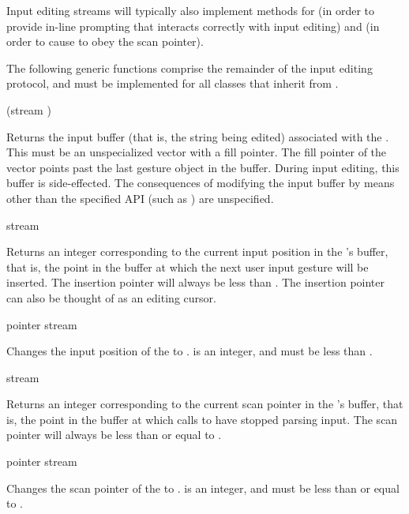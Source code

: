 Input editing streams will typically also implement methods for
 (in order to provide in-line prompting that interacts
correctly with input editing) and  (in order to cause
 to obey the scan pointer).

The following generic functions comprise the remainder of the input editing
protocol, and must be implemented for all classes that inherit from
.


 {(stream )}

Returns the input buffer (that is, the string being edited) associated with the
 .  This must be an unspecialized vector
with a fill pointer.  The fill pointer of the vector points past the last gesture
object in the buffer.  During input editing, this buffer is side-effected.  The
consequences of modifying the input buffer by means other than the specified API
(such as ) are unspecified.

 {stream}

Returns an integer corresponding to the current input position in the
 's buffer, that is, the point in the
buffer at which the next user input gesture will be inserted.  The insertion
pointer will always be less than .  The insertion pointer can also be thought of as an editing
cursor.

 {pointer stream}

Changes the input position of the   to
.   is an integer, and must be less than
.

 {stream}

Returns an integer corresponding to the current scan pointer in the  's buffer, that is, the point in the buffer at which
calls to  have stopped parsing input.  The scan pointer will always
be less than or equal to .

 {pointer stream}

Changes the scan pointer of the   to
.   is an integer, and must be less than or equal to
.


